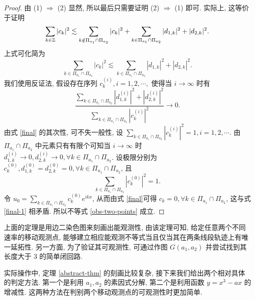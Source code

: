 \begin{proof}
由 (1) $\Rightarrow$ (2) 显然, 所以最后只需要证明 (2) $\Rightarrow$ (1) 即可. 实际上, 这等价于证明
\begin{equation*}
    \sum_{k\in \mathbb{Z}} |c_k|^2\lesssim \sum_{k\notin \Pi_{a_1}\cap \Pi_{a_2}}|c_k|^2+\sum_{k\in \Pi_{a_1}\cap \Pi_{a_2}} |d_{1,k}|^2+|d_{2,k}|^2.
\end{equation*}
上式可化简为
\begin{equation}\label{final}
    \sum_{k\in \Pi_{a_1}\cap \Pi_{a_2}}|c_k|^2\lesssim \sum_{k\in \Pi_{a_1}\cap \Pi_{a_2}} |d_{1,k}|^2+|d_{2,k}|^2.
\end{equation}
我们使用反证法, 假设存在序列 $c_k^{(i)},i=1,2,\cdots,$ 使得当 $i\to \infty$ 时有
\begin{equation*}
    \frac{\sum_{k\in \Pi_{a_1}\cap \Pi_{a_2}} |d^{(i)}_{1,k}|^2+|d^{(i)}_{2,k}|^2}{ \sum_{k\in \Pi_{a_1}\cap \Pi_{a_2}}|c^{(i)}_k|^2}\longrightarrow 0.
\end{equation*}
由式 \ref{final} 的其次性, 可不失一般性, 设 $\sum_{k\in \Pi_{a_1}\cap \Pi_{a_2}}|c_k^{(i)}|^2=1, i=1,2,\cdots$. 由 $\Pi_{a_1}\cap \Pi_{a_2}$ 中元素只有有限个可知当 $i\to \infty$ 时 $d^{(i)}_{1,k}\to 0, d^{(i)}_{2,k}\to 0,\forall k\in \Pi_{a_1}\cap \Pi_{a_2}$. 设极限分别为 $c^{(0)}_k, d^{(0)}_{1,k}=d^{(0)}_{2,k}=0, \forall k\in \Pi_{a_1}\cap \Pi_{a_2}$, 且 
\begin{equation}\label{final-1}
    \sum_{k\in \Pi_{a_1}\cap \Pi_{a_2}}|c_k^{(0)}|^2=1.
\end{equation}
令 $u_0=\sum_{k\in \Pi_{a_1}\cap \Pi_{a_2}}c^{(0)}_k e^{ikx}$, 
从而由式 \eqref{final}可得 $c_k=0,\forall k\in \Pi_{a_1}\cap \Pi_{a_2}$, 这与式 \eqref{final-1} 相矛盾. 所以不等式 \eqref{obs-two-points} 成立.
\end{proof}
上面的定理是用边二染色图来刻画出能观测性, 由该定理可知, 给定任意两个不同速率的移动观测点, 能够建立相应能观测不等式当且仅当其在两条线段轨迹上有唯一延拓性. 另一方面, 为了验证其可观测性, 可通过作图 $G(a_1,a_2)$ 并尝试找到其长度大于 3 的简单闭回路. 

实际操作中, 定理 \ref{abstract-thm} 的刻画比较复杂, 接下来我们给出两个相对具体的判定方法. 第一个是利用 $a_1,a_2$ 的素因式分解, 第二个是利用函数 $y=x^3-ax$ 的增减性. 这两种方法在判别两个移动观测点的可观测性时更加简单.

